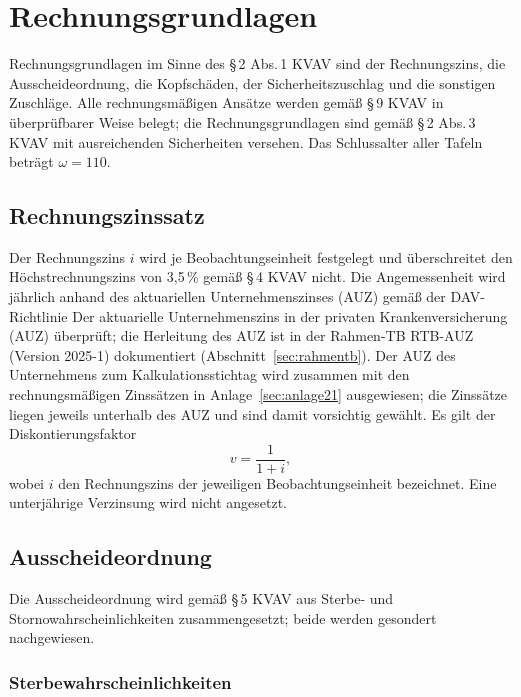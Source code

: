\section{Rechnungsgrundlagen}\label{sec:rechnungsgrundlagen}

Rechnungsgrundlagen im Sinne des \S\,2 Abs.\,1 KVAV sind der
Rechnungszins, die Ausscheideordnung, die Kopfschäden, der
Sicherheitszuschlag und die sonstigen Zuschläge. Alle rechnungsmäßigen
Ansätze werden gemäß \S\,9 KVAV in überprüfbarer Weise belegt; die
Rechnungsgrundlagen sind gemäß \S\,2 Abs.\,3 KVAV mit ausreichenden
Sicherheiten versehen. Das Schlussalter aller Tafeln beträgt
$\omega = 110$.

\subsection{Rechnungszinssatz}\label{sec:zins}

Der Rechnungszins $i$ wird je Beobachtungseinheit festgelegt und
überschreitet den Höchstrechnungszins von 3{,}5\,\% gemäß \S\,4 KVAV
nicht. Die Angemessenheit wird jährlich anhand des aktuariellen
Unternehmenszinses (AUZ) gemäß der DAV-Richtlinie
\glqq Der aktuarielle Unternehmenszins in der privaten
Krankenversicherung (AUZ)\grqq{} überprüft; die Herleitung des AUZ ist
in der Rahmen-TB \mbox{RTB-AUZ} (Version 2025-1) dokumentiert
(Abschnitt~\ref{sec:rahmentb}). Der AUZ des Unternehmens zum
Kalkulationsstichtag wird zusammen mit den rechnungsmäßigen Zinssätzen
in Anlage~\ref{sec:anlage21} ausgewiesen; die Zinssätze
liegen jeweils unterhalb des AUZ und sind damit vorsichtig gewählt. Es gilt der Diskontierungsfaktor
\begin{equation}
v = \frac{1}{1+i},
\label{eq:diskont}
\end{equation}
wobei $i$ den Rechnungszins der jeweiligen Beobachtungseinheit
bezeichnet. Eine unterjährige Verzinsung wird nicht angesetzt.

\subsection{Ausscheideordnung}\label{sec:ausscheideordnung}

Die Ausscheideordnung wird gemäß \S\,5 KVAV aus Sterbe- und
Stornowahrscheinlichkeiten zusammengesetzt; beide werden gesondert
nachgewiesen.

\subsubsection{Sterbewahrscheinlichkeiten}\label{sec:sterblichkeit}

